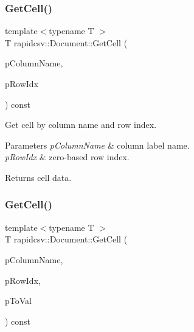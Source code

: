 \subsubsection{\texorpdfstring{Get\+Cell()}{GetCell()}\hspace{0.1cm}{\footnotesize\ttfamily [5/8]}}
{\footnotesize\ttfamily template$<$typename T $>$ \\
T rapidcsv\+::\+Document\+::\+Get\+Cell (\begin{DoxyParamCaption}\item[{const std\+::string \&}]{p\+Column\+Name,  }\item[{const size\+\_\+t}]{p\+Row\+Idx }\end{DoxyParamCaption}) const\hspace{0.3cm}{\ttfamily [inline]}}



Get cell by column name and row index. 


\begin{DoxyParams}{Parameters}
{\em p\+Column\+Name} & column label name. \\
\hline
{\em p\+Row\+Idx} & zero-\/based row index. \\
\hline
\end{DoxyParams}
\begin{DoxyReturn}{Returns}
cell data. 
\end{DoxyReturn}
\mbox{\label{classrapidcsv_1_1Document_af5af1480a4456347fade6354f7d47d8e}} 
\subsubsection{\texorpdfstring{Get\+Cell()}{GetCell()}\hspace{0.1cm}{\footnotesize\ttfamily [6/8]}}
{\footnotesize\ttfamily template$<$typename T $>$ \\
T rapidcsv\+::\+Document\+::\+Get\+Cell (\begin{DoxyParamCaption}\item[{const std\+::string \&}]{p\+Column\+Name,  }\item[{const size\+\_\+t}]{p\+Row\+Idx,  }\item[{Conv\+Func$<$ T $>$}]{p\+To\+Val }\end{DoxyParamCaption}) const\hspace{0.3cm}{\ttfamily [inline]}}



